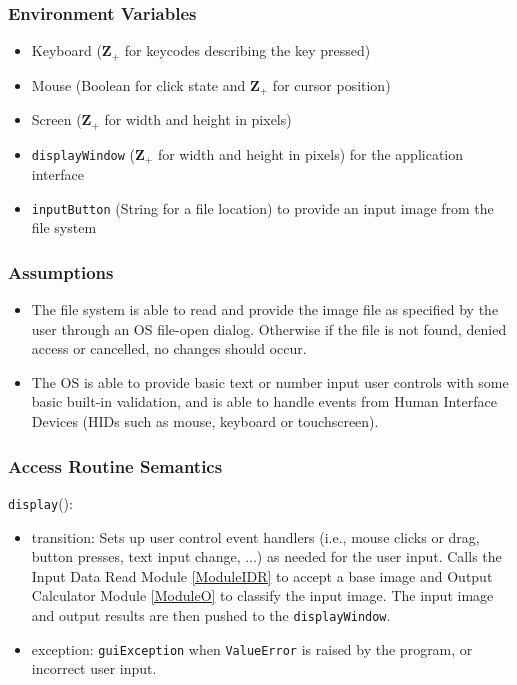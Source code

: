\documentclass[12pt, titlepage]{article}
\def\code#1{\texttt{#1}}
\begin{document}
\subsubsection{Environment Variables}

\begin{itemize}
  \item Keyboard ($\mathbf{Z}_{+}$ for keycodes describing the key pressed)
  \item Mouse (Boolean for click state and  $\mathbf{Z}_{+}$ for cursor position)
  \item Screen ($\mathbf{Z}_{+}$ for width and height in pixels)
  \item \code{displayWindow} ($\mathbf{Z}_{+}$ for width and height in pixels) for the application interface
  \item \code{inputButton} (String for a file location) to provide an input image from the file system
\end{itemize}

\subsubsection{Assumptions}

\begin{itemize}
  \item The file system is able to read and provide the image file as specified by the user through an OS file-open dialog.
  Otherwise if the file is not found, denied access or cancelled, no changes should occur.
  \item The OS is able to provide basic text or number input user controls with some basic built-in validation, and
  is able to handle events from Human Interface Devices (HIDs such as mouse, keyboard or touchscreen).
\end{itemize}


\subsubsection{Access Routine Semantics}

\noindent \code{display}():
\begin{itemize}
\item transition: Sets up user control event handlers (i.e., mouse clicks or drag, button presses, text input change, ...) 
as needed for the user input. Calls the Input Data Read Module \ref{ModuleIDR} to accept a base image and Output Calculator Module \ref{ModuleO} to classify the input
image. The input image and output results are then pushed to the \code{displayWindow}.
\item exception: \code{guiException} when \code{ValueError} is raised by the program, or incorrect user input.
\end{itemize}
\end{document}

